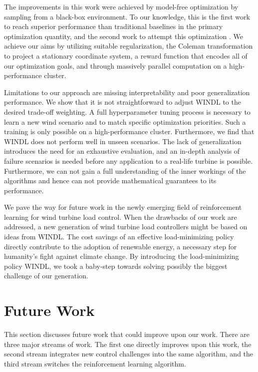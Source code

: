 The improvements in this work were achieved by model-free optimization by sampling from a black-box environment. To our knowledge, this is the first work to reach superior performance than traditional baselines in the primary optimization quantity, and the second work to attempt this optimization \cite{coqueletBiomimeticIndividualPitch2020}. We achieve our aims by utilizing suitable regularization, the Coleman transformation to project a stationary coordinate system, a reward function that encodes all of our optimization goals, and through massively parallel computation on a high-performance cluster.

Limitations to our approach are missing interpretability and poor generalization performance. We show that it is not straightforward to adjust WINDL to the desired trade-off weighting. A full hyperparameter tuning process is necessary to learn a new wind scenario and to match specific optimization priorities. Such a training is only possible on a high-performance cluster. Furthermore, we find that WINDL does not perform well in unseen scenarios. The lack of generalization introduces the need for an exhaustive evaluation, and an in-depth analysis of failure scenarios is needed before any application to a real-life turbine is possible. Furthermore, we can not gain a full understanding of the inner workings of the algorithms and hence can not provide mathematical guarantees to its performance.

We pave the way for future work in the newly emerging field of reinforcement learning for wind turbine load control. When the drawbacks of our work are addressed, a new generation of wind turbine load controllers might be based on ideas from WINDL. The cost savings of an effective load-minimizing policy directly contribute to the adoption of renewable energy, a necessary step for humanity's fight against climate change. By introducing the load-minimizing policy WINDL, we took a baby-step towards solving possibly the biggest challenge of our generation.

\section{Future Work}

This section discusses future work that could improve upon our work. There are three major streams of work. The first one directly improves upon this work, the second stream integrates new control challenges into the same algorithm, and the third stream switches the reinforcement learning algorithm.

